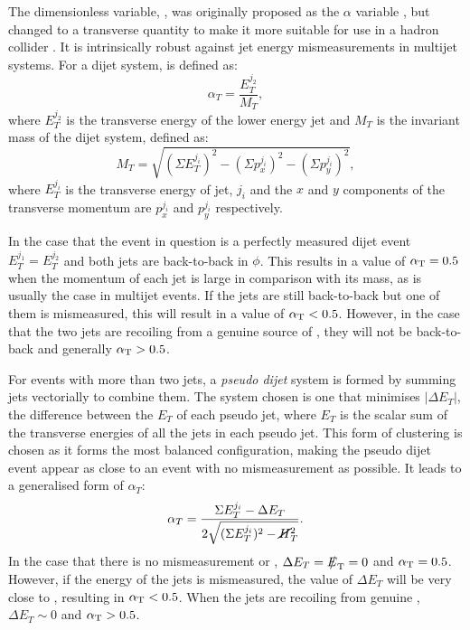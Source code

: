 The dimensionless variable, \alphat, was originally proposed as the
$\alpha$ variable \cite{Randall:2008rw}, but changed to a transverse
quantity to make it more suitable for use in a hadron collider
\cite{CMS-PAS-SUS-08-005,CMS-PAS-SUS-09-001}. It is intrinsically
robust against jet energy mismeasurements in multijet systems. For a
dijet system, \alphat is defined as: 
\begin{equation}
\alpha_T=\frac{E_T^{j_2}}{M_T}, 
\end{equation} 
where $E_T^{j_2}$ is the transverse energy of the lower energy jet and
$M_T$ is the invariant mass of the dijet
system, defined as:
\begin{equation}
M_T=\sqrt{(\Sigma E_T^{j_i})^2-(\Sigma p_x^{j_i})^2-(\Sigma
p_y^{j_i})^2},
\end{equation}
where $E_T^{j_i}$ is the transverse energy of jet, $j_i$ and the $x$
and $y$ components of the transverse momentum are $p_x^{j_i}$ and
$p_y^{j_i}$ respectively.

In the case that the event in question is a perfectly measured dijet
event $E_T^{j_1}=E_T^{j_2}$ and both jets are back-to-back in $\phi$.
This results in a value of $\alpha_{\text{T}}=0.5$ when the momentum of each jet
is large in comparison with its mass, as is usually the case in
\QCD multijet events. If the jets are still back-to-back but one of
them is mismeasured, this will result in a value of $\alpha_{\text{T}}<0.5$.
However, in the case that the two jets are recoiling from a genuine
source of \MET, they will not be back-to-back and generally $\alpha_{\text{T}}>0.5$.

For events with more than two jets, a \emph{pseudo dijet} system is
formed by summing jets vectorially to combine them.  The system chosen
is one that minimises $|\Delta E_T|$, the difference between the $E_T$
of each pseudo jet, where $E_T$ is the scalar sum of the transverse
energies of all the jets in each pseudo jet. This form of clustering
is chosen as it forms the most balanced configuration, making the
pseudo dijet event appear as close to an event with no mismeasurement
as possible. It leads to a generalised form of $\alpha_T$: 
\begin{equation}
\alpha_T=\frac{\Sigma E_T^{j_i}-\Delta
E_T}{2\sqrt{(\Sigma E_T^{j_i})^2-\cancel{H}_T^2}}.
\end{equation} 
In the case that there is no mismeasurement or \MET, $\Delta
E_T=\MET=0$ and $\alpha_{\text{T}}=0.5$. However, if the energy of the jets is
mismeasured, the value of $\Delta E_T$ will be very close to \MET,
resulting in $\alpha_{\text{T}}<0.5$. When the jets are recoiling from genuine
\MET, $\Delta E_T\sim 0$ and $\alpha_{\text{T}}>0.5$.
  
